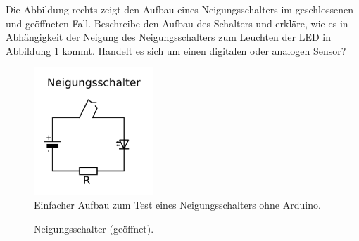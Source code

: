 \medskip
\begin{aufgabe}
	
	\medskip
	\begin{minipage}{0.59\textwidth}
		Die Abbildung rechts zeigt den Aufbau eines Neigungsschalters im geschlossenen und geöffneten Fall. Beschreibe den Aufbau des Schalters und erkläre, wie es in Abhängigkeit der Neigung des Neigungsschalters zum Leuchten der LED in Abbildung \ref{abb:neigungsschalter-einfach} kommt. Handelt es sich um einen digitalen oder analogen Sensor?
		
		\begin{figure}[H]
			\centering
			\includegraphics[width=0.4\textwidth]{./Zeichnungen/neigungsschalter-einfach.png}
			\caption{Einfacher Aufbau zum Test eines Neigungsschalters ohne Arduino.}
			\label{abb:neigungsschalter-einfach}
		\end{figure}
	\end{minipage}
	\hfill
	\begin{minipage}{0.39\textwidth}
		\begin{figure}[H]
			\centering
			\caption{Neigungsschalter (geöffnet).}
		\end{figure}
		

\end{minipage}
\end{aufgabe}
